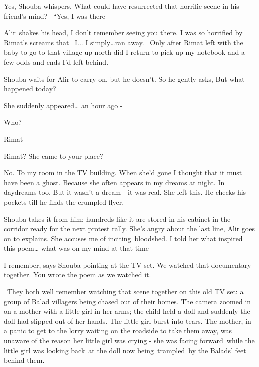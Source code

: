 \documentclass[12pt]{book}
\begin{document}
{\textquotedbl}Yes,{\textquotedbl} Shouba whispers. What could have resurrected that horrific scene in his friend's
mind? \ {}``Yes, I was there -{\textquotedbl}

Alir~shakes his head, {\textquotedbl}I don't remember seeing you there.{ }I was so horrified by Rimat's
screams that \ I... I simply{\dots}ran away. \ Only after Rimat left with the baby to go to that village up north did I
return to pick up my notebook and a few odds and ends I'd left behind.{\textquotedbl}

Shouba waits for Alir to carry on, but he doesn't. So he gently asks, {\textquotedbl}But what happened
today?{\textquotedbl}

{\textquotedbl}She suddenly appeared{\dots} an hour ago -{\textquotedbl}

{\textquotedbl}Who?{\textquotedbl}

{\textquotedbl}Rimat -{\textquotedbl}

{\textquotedbl}Rimat? She came to your place?{\textquotedbl}

{\textquotedbl}No. To my room in the TV building. When she'd gone I thought that it must have been a ghost. Because she
often appears in my dreams at night. In daydreams too. But it wasn't a dream - it was real. She left
this.{\textquotedbl} He checks his pockets till he finds the crumpled flyer.

Shouba takes it from him; hundreds like it are stored in his cabinet in the corridor ready for the next protest rally.
{\textquotedbl}She's angry about the last line,{\textquotedbl} Alir goes on to explains. {\textquotedbl}She accuses me
of inciting~bloodshed. I told her what inspired this poem{\dots} what was on my mind at that time -{\textquotedbl}

{\textquotedbl}I remember,{\textquotedbl} says Shouba pointing at the TV set. {\textquotedbl}We watched that documentary
together. You wrote the poem as we watched it.{\textquotedbl}

\ They both well remember watching that scene together on this old TV set: a group of Balad villagers being chased out
of their homes. The camera zoomed in on a mother with a little girl in her arms; the child held a doll and suddenly the
doll had slipped out of her hands. The little girl burst into tears. The mother, in a panic to get to the lorry waiting
on the roadside to take them away, was unaware of the reason her little girl was crying - she was facing forward~while
the little girl was looking back~at the doll now being~trampled~by the Balads' feet behind them.
\end{document}
